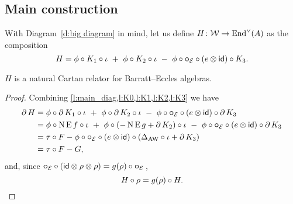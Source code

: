 \subsection{Main construction}

With Diagram~\eqref{d:big diagram} in mind, let us define $H \colon \cW \to \End^\vee(A)$ as the composition
\[
H = \phi \comp K_1 \comp \iota \ +\ \phi \comp K_2 \comp \iota \ -\ \phi \comp \bcomp_{\BE} \comp (e \ot \id) \comp K_3.
\]

\begin{theorem}
	$H$ is a natural Cartan relator for Barratt--Eccles algebras.
\end{theorem}

\begin{proof} Combining \cref{l:main_diag,l:K0,l:K1,l:K2,l:K3} we have
	\begin{align*}
		\bd H &=
		\phi \comp \bd K_1 \comp \iota \ +\
		\phi \comp \bd K_2 \comp \iota \ -\
		\phi \comp \bcomp_{\BE} \comp (e \ot \id) \comp \bd K_3 \\ &=
		\phi \comp \chains\EE f \comp \iota \ +\
		\phi \comp (-\chains\EE g + \bd K_2) \comp \iota \ -\
		\phi \comp \bcomp_{\BE} \comp (e \ot \id) \comp \bd K_3 \\ &=
		\tau \comp F - \phi \comp \bcomp_{\BE} \comp (e \ot \id) \comp (\Delta_{\AW} \comp \iota + \bd K_3) \\ &=
		\tau \comp F - G,
	\end{align*}
	and, since $\bcomp_{\BE} \comp (\id \ot \rho \ot \rho) = g(\rho) \comp \bcomp_{\BE}$\,,
	\[
	H \comp \rho = g(\rho) \comp H. \qedhere
	\]
\end{proof}